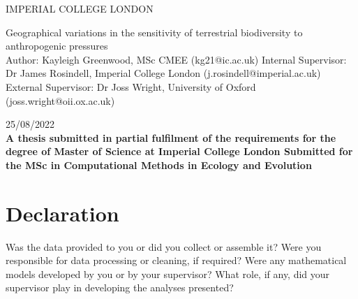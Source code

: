 \documentclass[11pt, a4paper, titlepage]{article}
\begin{document}
    \begin{titlepage}
    \begin{center}
            {\large IMPERIAL COLLEGE LONDON}
    \end{center}
    
    \vspace*{\fill}
    
    \begin{center}
        {\Huge 
    	 Geographical variations in the sensitivity of terrestrial biodiversity to anthropogenic pressures}
        \\[2in]
        Author: Kayleigh Greenwood, MSc CMEE (kg21@ic.ac.uk)
        \bigskip
        \newline
       Internal Supervisor: Dr James Rosindell, Imperial College London (j.rosindell@imperial.ac.uk)
       \bigskip
       \newline
        External Supervisor: Dr Joss Wright, University of Oxford (joss.wright@oii.ox.ac.uk)
        \bigskip
        \newline

        25/08/2022
        \\[2in]
        
        {\bfseries A thesis submitted in partial fulfilment of the requirements for the degree of Master of Science at Imperial College London \newline \newline Submitted for the MSc in Computational Methods in Ecology and Evolution }

        

    
	\end{center}
    \vspace{\fill}
    
    \end{titlepage}
	\section*{Declaration}
	\begin{center}
	Was the data provided to you or did you collect or assemble it? \newline
	Were you responsible for data processing or cleaning, if required? \newline
	Were any mathematical models developed by you or by your supervisor? \newline
	What role, if any, did your supervisor play in developing the analyses presented?
	\end{center}
\end{document}
